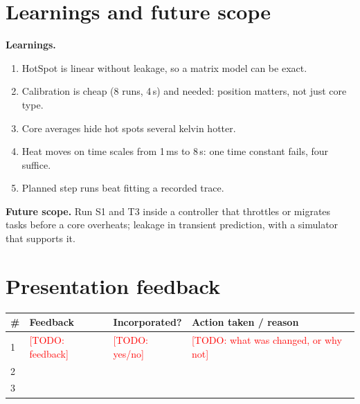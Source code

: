 \documentclass[11pt,a4paper]{article}
\newcommand{\todo}[1]{\textcolor{red}{[TODO: #1]}}
\begin{document}
\section{Learnings and future scope}
\textbf{Learnings.}
\begin{enumerate}
  \item HotSpot is linear without leakage, so a matrix model can be exact.
  \item Calibration is cheap (8 runs, 4\,s) and needed: position matters, not just core type.
  \item Core averages hide hot spots several kelvin hotter.
  \item Heat moves on time scales from 1\,ms to 8\,s: one time constant fails, four suffice.
  \item Planned step runs beat fitting a recorded trace.
\end{enumerate}
\textbf{Future scope.} Run S1 and T3 inside a controller that throttles or migrates tasks before a
core overheats; leakage in transient prediction, with a simulator that supports it.

\section{Presentation feedback}
\begin{center}
\small
\begin{tabular}{@{}l p{6cm} l p{5cm}@{}}
\toprule
\# & Feedback & Incorporated? & Action taken / reason \\
\midrule
1 & \todo{feedback} & \todo{yes/no} & \todo{what was changed, or why not} \\
2 & & & \\
3 & & & \\
\bottomrule
\end{tabular}
\end{center}

\end{document}
